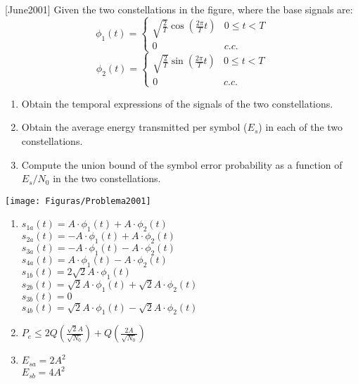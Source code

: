 \documentclass[es,boletin]{uah}
\begin{document}
{
	[June2001] Given the two constellations in the figure, where the base signals are:
		\begin{displaymath}
		\phi_1(t) = \left \{ \begin{array}{ll} \sqrt{\frac{2}{T}} \cos \left ( \frac{2\pi}{T} t \right ) & 0\leq t < T \\ 0 & c.c. \end{array} \right .
		\end{displaymath}
		\begin{displaymath}
		\phi_2(t) = \left \{ \begin{array}{ll} \sqrt{\frac{2}{T}} \sin \left ( \frac{2\pi}{T} t \right ) & 0\leq t < T \\ 0 & c.c. \end{array} \right .
		\end{displaymath}

		\begin{enumerate}
			\item Obtain the temporal expressions of the signals of the two constellations.
			   \item Obtain the average energy transmitted per symbol ($E_s$) in each of the two constellations.
			   \item Compute the union bound of the symbol error probability as a function of $E_s/N_0$ in the two constellations.
			\end{enumerate}

			\begin{center}
				\texttt{[image: Figuras/Problema2001]}
			\end{center}
}
{
	\begin{enumerate}
		\item $s_{1a}(t) = A \cdot \phi_1(t) + A \cdot \phi_2(t)$ \\
		$s_{2a}(t) = -A \cdot \phi_1(t) + A \cdot \phi_2(t)$ \\
		$s_{3a}(t) = -A \cdot \phi_1(t) - A \cdot \phi_2(t)$ \\
		$s_{4a}(t) = A \cdot \phi_1(t) - A \cdot \phi_2(t)$ \\
		$s_{1b}(t) = 2\sqrt{2}A \cdot \phi_1(t)$ \\
		$s_{2b}(t) = \sqrt{2} A \cdot \phi_1(t) + \sqrt{2} A \cdot \phi_2(t)$ \\
		$s_{3b}(t) = 0$ \\
		$s_{4b}(t) = \sqrt{2} A \cdot \phi_1(t) - \sqrt{2} A \cdot \phi_2(t)$ \\

		\item $P_e \leq 2 Q\left ( \frac{\sqrt{2}A}{\sqrt{N_0}} \right ) + Q \left ( \frac{2A}{\sqrt{N_0}} \right )$
  
		\item $E_{sa} = 2A^2$ \\
				$E_{sb} = 4A^2$
	\end{enumerate} 
}
\end{document}

